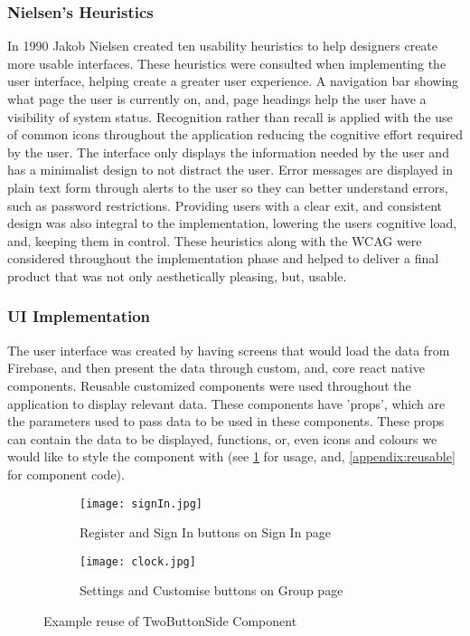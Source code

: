 \subsubsection{Nielsen's Heuristics }
In 1990 Jakob Nielsen created ten usability heuristics \cite{nielsen} to help designers create more usable interfaces. These heuristics were consulted when implementing the user interface, helping create a greater user experience. A navigation bar showing what page the user is currently on, and, page headings help the user have a visibility of system status. Recognition rather than recall is applied with the use of common icons throughout the application reducing the cognitive effort required by the user. The interface only displays the information needed by the user and has a minimalist design to not distract the user. Error messages are displayed in plain text form through alerts to the user so they can better understand errors, such as password restrictions. Providing users with a clear exit, and consistent design was also integral to the implementation, lowering the users cognitive load, and, keeping them in control. These heuristics along with the WCAG were considered throughout the implementation phase and helped to deliver a final product that was not only aesthetically pleasing, but, usable.

\subsubsection{UI Implementation}
The user interface was created by having screens that would load the data from Firebase, and then present the data through custom, and, core react native components. Reusable customized components were used throughout the application to display relevant data. These components have 'props', which are the parameters used to pass data to be used in these components. These props can contain the data to be displayed, functions, or, even icons and colours we would like to style the component with (see \ref{fig:reuseComp} for usage, and, \ref{appendix:reusable} for component code).


\begin{figure}[!htbp]
    \centering
    \begin{subfigure}[b]{0.25\textwidth}
        \texttt{[image: signIn.jpg]}
        \caption{Register and Sign In buttons on Sign In page}
    \end{subfigure}
    \hspace{1.5em}
    \begin{subfigure}[b]{0.25\textwidth}
        \texttt{[image: clock.jpg]}
        \caption{Settings and Customise buttons on Group page}
    \end{subfigure}
    \caption{Example reuse of TwoButtonSide Component}
    \label{fig:reuseComp}
\end{figure}
\FloatBarrier
